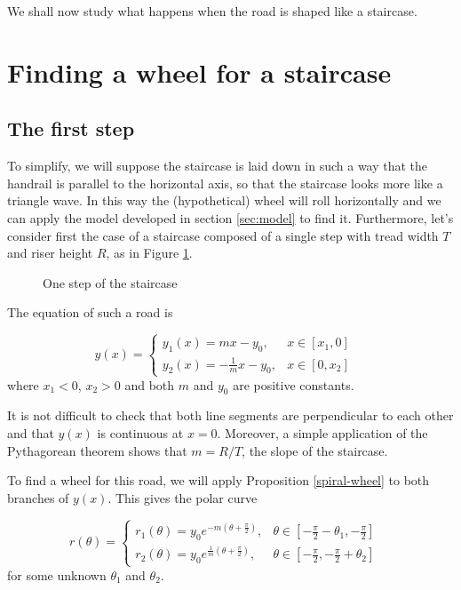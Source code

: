 \documentclass{article}
\theoremstyle{theorem}
\theoremstyle{theorem}
\begin{document}
We shall now study what happens when the road is shaped like a
staircase.

\section{Finding a wheel for a staircase}

\subsection{The first step}

To simplify, we will suppose the staircase is laid down in such a way
that the handrail is parallel to the horizontal axis, so that the
staircase looks more like a triangle wave. In this way the
(hypothetical) wheel will roll horizontally and we can apply the model
developed in section \ref{sec:model} to find it. Furthermore, let's
consider first the case of a staircase composed of a single step with
tread width $T$ and riser height $R$, as in Figure \ref{fig:step}.

\begin{figure}[h]
\centering

\caption{One step of the staircase}
\label{fig:step}
\end{figure}

The equation of such a road is

\begin{equation}
  \label{eq:staircase}
  y(x)=
  \left \lbrace
    \begin{array}{ll}
      y_1(x) = mx-y_0, & x \in [x_1,0] \\
      y_2(x) = -\frac{1}{m}x-y_0, & x \in [0, x_2]
    \end{array}
  \right. \quad
\end{equation}
where $x_1<0$, $x_2>0$ and both $m$ and $y_0$ are positive constants.

It is not difficult to check that both line segments are perpendicular
to each other and that $y(x)$ is continuous at $x=0$. Moreover, a simple application of the Pythagorean theorem
shows that $m=R/T$, the slope of the staircase.

To find a wheel for this road, we will apply Proposition
\ref{spiral-wheel} to
both branches of $y(x)$. This gives the polar curve

\begin{equation}
  \label{eq:petal}
  r(\theta)=
  \left \lbrace
    \begin{array}{ll}
      r_1(\theta) = y_0e^{-m\left(\theta+\frac{\pi}{2}\right)}, & \theta \in \left[-\frac{\pi}{2}-\theta_1,-\frac{\pi}{2}\right] \\
      r_2(\theta) = y_0e^{\frac{1}{m}\left(\theta+\frac{\pi}{2}\right)}, & \theta \in \left[-\frac{\pi}{2}, -\frac{\pi}{2}+\theta_2\right]
    \end{array}
  \right. \quad
\end{equation}
for some unknown $\theta_1$ and $\theta_2$.
\end{document}
